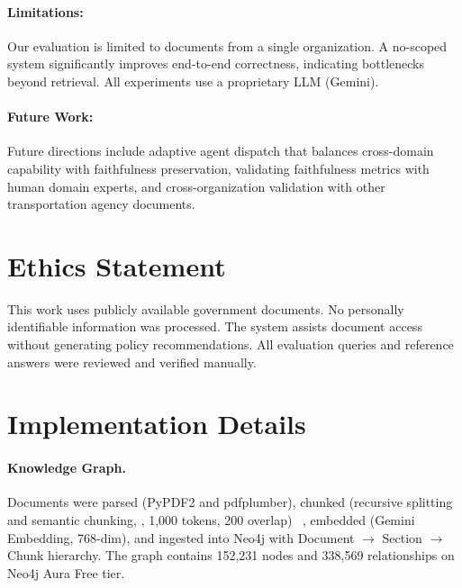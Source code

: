 \documentclass{article}
\begin{document}
\paragraph{Limitations:} Our evaluation is limited to documents from a single organization. A no-scoped system significantly improves end-to-end correctness, indicating bottlenecks beyond retrieval. All experiments use a proprietary LLM (Gemini).

\paragraph{Future Work:} Future directions include adaptive agent dispatch that balances cross-domain capability with faithfulness preservation, validating faithfulness metrics with human domain experts, and cross-organization validation with other transportation agency documents.


\section*{Ethics Statement}
This work uses publicly available government documents. No personally identifiable information was processed. The system assists document access without generating policy recommendations. All evaluation queries and reference answers were reviewed and verified manually.




\appendix






\section{Implementation Details}
\label{app:implementation}



\paragraph{Knowledge Graph.} Documents were parsed (PyPDF2 and pdfplumber), chunked (recursive splitting and semantic chunking, , 1,000 tokens, 200 overlap) ~\citep{langchain2024recursive}, embedded (Gemini Embedding, 768-dim), and ingested into Neo4j with Document $\rightarrow$ Section $\rightarrow$ Chunk hierarchy. The graph contains 152,231 nodes and 338,569 relationships on Neo4j Aura Free tier.
\end{document}
